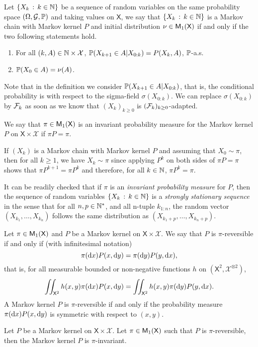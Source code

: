 \documentclass[english,graybox,envcountchap,envcountsame,sectrefs,shortlabels]{svmono}
\theoremstyle{style}
\newcommand{\Xset}{\mathsf{X}}
\newcommand{\Xsigma}{\mathcal{X}}
\begin{document}
\begin{definition}
Let $\left\{ X_{k}\,:\,k\in\mathbb{N}\right\}$
be a sequence of random variables on the same probability space $(\Omega,\mathcal{G},\mathbb{P})$
and taking values on $\Xset$, we say that $\left\{ X_{k}\,:\,k\in\mathbb{N}\right\}$
is a Markov chain with Markov kernel $P$ and initial distribution
$\nu\in\meas 1(\Xset)$ if and only if the two following statements hold.
\begin{enumerate}
\item  For all $(k,A)\in\nset\times\Xsigma$,  $\mathbb{P}(X_{k+1}\in A|X_{0:k})=P(X_{k},A)$,
$\mathbb{P}$-a.s.
\item $\mathbb{P}(X_{0}\in A)=\nu(A)$.
\end{enumerate}
\end{definition}
Note that in the definition we consider $\mathbb{P}(X_{k+1}\in A|X_{0:k})$,
that is, the conditional probability is with respect to the sigma-field
$\sigma(X_{0:k})$. We can replace $\sigma(X_{0:k})$ by
$\mathcal{F}_{k}$ as soon as we know that $(X_{k})_{k\geq0}$ is $(\mathcal{F}_{k})_{k\geq0}$-adapted.

\begin{definition}
We say that $\pi\in\meas 1(\Xset)$ is an invariant probability measure
for the Markov kernel $P$ on $\Xset\times\Xsigma$ if $\pi P=\pi$.
\end{definition}
If $(X_{k})$ is a Markov chain with Markov kernel $P$
and assuming that $X_{0}\sim\pi$, then for all $k\geq1$, we have
$X_{k}\sim\pi$ since applying $P^{k}$ on
both sides of $\pi P=\pi$ shows that $\pi P^{k+1}=\pi P^{k}$ and
therefore, for all $k\in\mathbb{N}$, $\pi P^{k}=\pi$. 

It can be readily checked that if $\pi$ is an \emph{invariant
probability measure }for $P$, then the sequence of random variables
$\left\{ X_{k}\,:\,k\in\mathbb{N}\right\}$ is a \emph{strongly stationary sequence} in the sense that for all $n,p\in\mathbb{N}^{*}$,
and all n-tuple $k_{1:n}$, the random vector $(X_{k_{1}},\ldots,X_{k_{n}})$
follows the same distribution as $(X_{k_{1}+p},\ldots,X_{k_{n}+p})$.

\begin{definition}
Let $\pi\in\meas 1(\Xset)$ and $P$ be a Markov kernel on $\Xset\times\Xsigma$.
We say that $P$ is $\pi$-reversible if and only if (with infinitesimal
notation)
\begin{equation}
\pi(\mathrm{d} x)P(x,\mathrm{d} y)=\pi(\mathrm{d} y)P(y,\mathrm{d} x),\label{eq:reversibility}
\end{equation}
that is, for all measurable bounded or non-negative functions $h$
on $\left(\Xset^{2},\Xsigma^{\otimes2}\right)$,
\begin{equation}
\iint_{\Xset^{2}}h(x,y)\pi(\rmd x)P(x,\rmd y)=\iint_{\Xset^{2}}h(x,y)\pi(\rmd y)P(y,\rmd x).\label{eq:reversibility:h}
\end{equation}
A Markov kernel $P$ is $\pi$-reversible if and only
if the probability measure $\pi(\mathrm{d} x)P(x,\mathrm{d} y)$ is symmetric
with respect to $(x,y)$. 
\end{definition}
\begin{proposition}
Let $P$ be a Markov kernel on $\Xset\times\Xsigma$. Let $\pi\in\meas 1(\Xset)$
such that $P$ is $\pi$-reversible, then the Markov kernel $P$ is
$\pi$-invariant.
\end{proposition}
\end{document}
